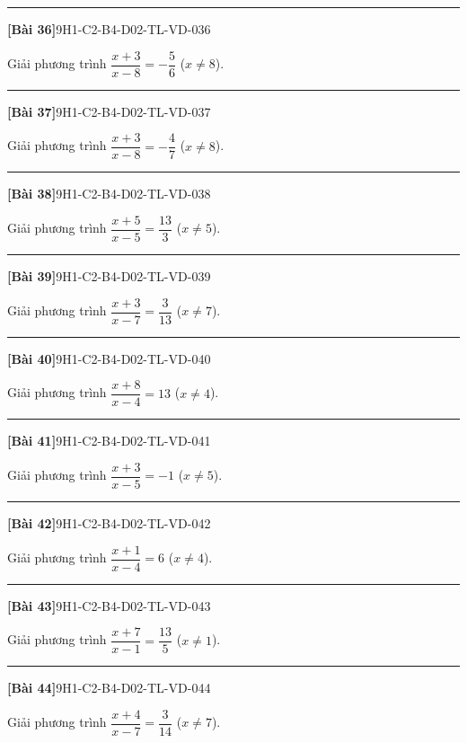 \documentclass[12pt,a4paper]{article}
\newif\ifloigiai
\newenvironment{cauhoi}[2]{%
  \par\medskip\noindent\rule{\textwidth}{0.4pt}\par\nopagebreak
  \noindent\textbf{[#1]}\hfill{\scriptsize\ttfamily #2}\par\nopagebreak\smallskip}{\par}
\newcommand{\loigiai}[1]{\ifloigiai\par\smallskip\noindent\textit{Lời giải.} #1\par\fi}
\begin{document}
\begin{cauhoi}{Bài 36}{9H1-C2-B4-D02-TL-VD-036}
Giải phương trình $\dfrac{x+3}{x-8}=-\dfrac{5}{6}$ ($x\ne 8$).
\loigiai{Điều kiện $x\ne 8$. Nhân hai vế với $x-8$: $x+3=-\dfrac{5}{6}(x-8)$. Giải ta được $x=2$ (thoả điều kiện).}
\end{cauhoi}
\begin{cauhoi}{Bài 37}{9H1-C2-B4-D02-TL-VD-037}
Giải phương trình $\dfrac{x+3}{x-8}=-\dfrac{4}{7}$ ($x\ne 8$).
\loigiai{Điều kiện $x\ne 8$. Nhân hai vế với $x-8$: $x+3=-\dfrac{4}{7}(x-8)$. Giải ta được $x=1$ (thoả điều kiện).}
\end{cauhoi}
\begin{cauhoi}{Bài 38}{9H1-C2-B4-D02-TL-VD-038}
Giải phương trình $\dfrac{x+5}{x-5}=\dfrac{13}{3}$ ($x\ne 5$).
\loigiai{Điều kiện $x\ne 5$. Nhân hai vế với $x-5$: $x+5=\dfrac{13}{3}(x-5)$. Giải ta được $x=8$ (thoả điều kiện).}
\end{cauhoi}
\begin{cauhoi}{Bài 39}{9H1-C2-B4-D02-TL-VD-039}
Giải phương trình $\dfrac{x+3}{x-7}=\dfrac{3}{13}$ ($x\ne 7$).
\loigiai{Điều kiện $x\ne 7$. Nhân hai vế với $x-7$: $x+3=\dfrac{3}{13}(x-7)$. Giải ta được $x=-6$ (thoả điều kiện).}
\end{cauhoi}
\begin{cauhoi}{Bài 40}{9H1-C2-B4-D02-TL-VD-040}
Giải phương trình $\dfrac{x+8}{x-4}=13$ ($x\ne 4$).
\loigiai{Điều kiện $x\ne 4$. Nhân hai vế với $x-4$: $x+8=13(x-4)$. Giải ta được $x=5$ (thoả điều kiện).}
\end{cauhoi}
\begin{cauhoi}{Bài 41}{9H1-C2-B4-D02-TL-VD-041}
Giải phương trình $\dfrac{x+3}{x-5}=-1$ ($x\ne 5$).
\loigiai{Điều kiện $x\ne 5$. Nhân hai vế với $x-5$: $x+3=-(x-5)$. Giải ta được $x=1$ (thoả điều kiện).}
\end{cauhoi}
\begin{cauhoi}{Bài 42}{9H1-C2-B4-D02-TL-VD-042}
Giải phương trình $\dfrac{x+1}{x-4}=6$ ($x\ne 4$).
\loigiai{Điều kiện $x\ne 4$. Nhân hai vế với $x-4$: $x+1=6(x-4)$. Giải ta được $x=5$ (thoả điều kiện).}
\end{cauhoi}
\begin{cauhoi}{Bài 43}{9H1-C2-B4-D02-TL-VD-043}
Giải phương trình $\dfrac{x+7}{x-1}=\dfrac{13}{5}$ ($x\ne 1$).
\loigiai{Điều kiện $x\ne 1$. Nhân hai vế với $x-1$: $x+7=\dfrac{13}{5}(x-1)$. Giải ta được $x=6$ (thoả điều kiện).}
\end{cauhoi}
\begin{cauhoi}{Bài 44}{9H1-C2-B4-D02-TL-VD-044}
Giải phương trình $\dfrac{x+4}{x-7}=\dfrac{3}{14}$ ($x\ne 7$).
\loigiai{Điều kiện $x\ne 7$. Nhân hai vế với $x-7$: $x+4=\dfrac{3}{14}(x-7)$. Giải ta được $x=-7$ (thoả điều kiện).}
\end{cauhoi}
\end{document}
